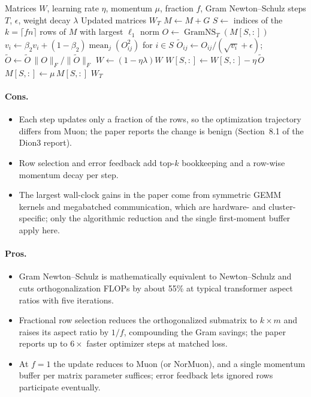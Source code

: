\begin{algorithm}[H]
\caption{Dion3 (Fractional Orthogonalization with Error Feedback)}
\label{alg:dion3}
\begin{algorithmic}[1]
\Require Matrices $W$, learning rate $\eta$, momentum $\mu$, fraction $f$, Gram Newton--Schulz steps $T$, $\epsilon$, weight decay $\lambda$
\Ensure Updated matrices $W_T$
    \State $M \gets M + G$ 
    \State $S \gets$ indices of the $k = \lceil f n \rceil$ rows of $M$ with largest $\ell_1$ norm 
    \State $O \gets \operatorname{GramNS}_T(M[S,:])$ 
        \State $v_i \gets \beta_2 v_i + (1-\beta_2)\operatorname{mean}_j(O_{ij}^2)$ for $i \in S$
        \State $\tilde O_{ij} \gets O_{ij}/(\sqrt{v_i}+\epsilon)$; \quad $\tilde O \gets \tilde O\,\lVert O\rVert_F/\lVert\tilde O\rVert_F$
    \EndIf
    \State $W \gets (1 - \eta\lambda) W$ 
    \State $W[S,:] \gets W[S,:] - \eta\,\tilde O$ 
    \State $M[S,:] \gets \mu\, M[S,:]$ 
\EndFor
\Return $W_T$
\end{algorithmic}
\end{algorithm}

\paragraph{Cons.}
\begin{itemize}[leftmargin=*]
\item Each step updates only a fraction of the rows, so the optimization trajectory differs from Muon; the paper reports the change is benign (Section~8.1 of the Dion3 report).
\item Row selection and error feedback add top-$k$ bookkeeping and a row-wise momentum decay per step.
\item The largest wall-clock gains in the paper come from symmetric GEMM kernels and megabatched communication, which are hardware- and cluster-specific; only the algorithmic reduction and the single first-moment buffer apply here.
\end{itemize}

\paragraph{Pros.}
\begin{itemize}[leftmargin=*]
\item Gram Newton--Schulz is mathematically equivalent to Newton--Schulz and cuts orthogonalization FLOPs by about 55\% at typical transformer aspect ratios with five iterations.
\item Fractional row selection reduces the orthogonalized submatrix to $k \times m$ and raises its aspect ratio by $1/f$, compounding the Gram savings; the paper reports up to $6\times$ faster optimizer steps at matched loss.
\item At $f = 1$ the update reduces to Muon (or NorMuon), and a single momentum buffer per matrix parameter suffices; error feedback lets ignored rows participate eventually.
\end{itemize}

